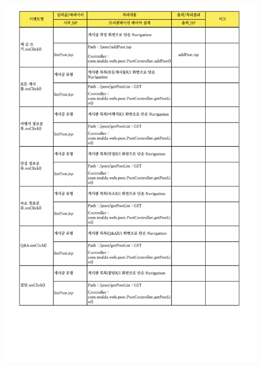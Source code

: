 {{{{{{{{{{{{{{{{{{{{{{{{{{{{{{{{{{{{{{{{{{{{{{{{{{{{{{\includegraphics[width=19cm]{./Figure/Design/Display/post/post_02.pdf} \\
}}}}}}}}}}}}}}}}}}}}}}}}}}}}}}}}}}}}}}}}}}}}}}}}}}}}}}
